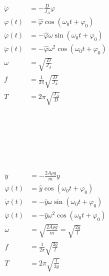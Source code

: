 \begin{boxleft}
\\
\\
\\
\\
\end{boxleft}\begin{boxrightshaded}
\begin{align*}
\ddot{\varphi}&=-\frac{D}{J_A}\varphi\\
\varphi(t)&=\hat{\varphi}\cos(\omega_0 t+\varphi_0)\\
\dot{\varphi}(t)&=-\hat{\varphi}\omega\sin(\omega_0 t+\varphi_0)\\
\ddot{\varphi}(t)&=-\hat{\varphi}\omega^2\cos(\omega_0 t+\varphi_0)\\
\omega&=\sqrt{\frac{D}{J_A}}\\
f&=\frac{1}{2\pi}\sqrt{\frac{D}{J_A}}\\
T&=2\pi\sqrt{\frac{J_A}{D}}
\end{align*}
\end{boxrightshaded}

\begin{boxleft}
\\
\\
\\
\\
\\
\end{boxleft}\begin{boxrightshaded}
\begin{align*}
\ddot{y}&=-\frac{2A\rho g}{m}y\\
\varphi(t)&=\hat{y}\cos(\omega_0 t+\varphi_0)\\
\dot{\varphi}(t)&=-\hat{y}\omega\sin(\omega_0 t+\varphi_0)\\
\ddot{\varphi}(t)&=-\hat{y}\omega^2\cos(\omega_0 t+\varphi_0)\\
\omega&=\sqrt{\frac{2A\rho g}{m}}=\sqrt{\frac{2g}{l}}\\
f&=\frac{1}{2\pi}\sqrt{\frac{2g}{l}}\\
T&=2\pi\sqrt{\frac{l}{2g}}
\end{align*}
\end{boxrightshaded}

